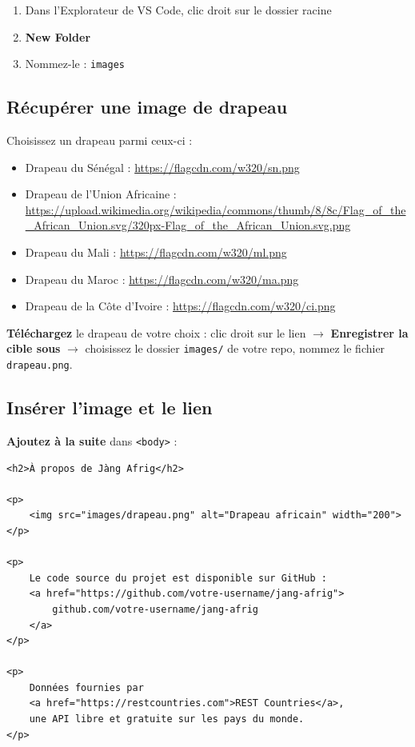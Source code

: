 \documentclass[11pt,a4paper]{article}
\begin{document}
\begin{enumerate}[nosep]
    \item Dans l'Explorateur de VS Code, clic droit sur le dossier racine
    \item \textbf{New Folder}
    \item Nommez-le : \texttt{images}
\end{enumerate}

\subsection{Récupérer une image de drapeau}

Choisissez un drapeau parmi ceux-ci :
\begin{itemize}[nosep]
    \item Drapeau du Sénégal : \url{https://flagcdn.com/w320/sn.png}
    \item Drapeau de l'Union Africaine : \url{https://upload.wikimedia.org/wikipedia/commons/thumb/8/8c/Flag_of_the_African_Union.svg/320px-Flag_of_the_African_Union.svg.png}
    \item Drapeau du Mali : \url{https://flagcdn.com/w320/ml.png}
    \item Drapeau du Maroc : \url{https://flagcdn.com/w320/ma.png}
    \item Drapeau de la Côte d'Ivoire : \url{https://flagcdn.com/w320/ci.png}
\end{itemize}

\textbf{Téléchargez} le drapeau de votre choix : clic droit sur le lien
$\to$ \textbf{Enregistrer la cible sous} $\to$ choisissez le dossier
\texttt{images/} de votre repo, nommez le fichier \texttt{drapeau.png}.

\subsection{Insérer l'image et le lien}

\textbf{Ajoutez à la suite} dans \texttt{<body>} :

\begin{lstlisting}[language=HTML5]
<h2>À propos de Jàng Afrig</h2>

<p>
    <img src="images/drapeau.png" alt="Drapeau africain" width="200">
</p>

<p>
    Le code source du projet est disponible sur GitHub :
    <a href="https://github.com/votre-username/jang-afrig">
        github.com/votre-username/jang-afrig
    </a>
</p>

<p>
    Données fournies par
    <a href="https://restcountries.com">REST Countries</a>,
    une API libre et gratuite sur les pays du monde.
</p>
\end{lstlisting}
\end{document}
